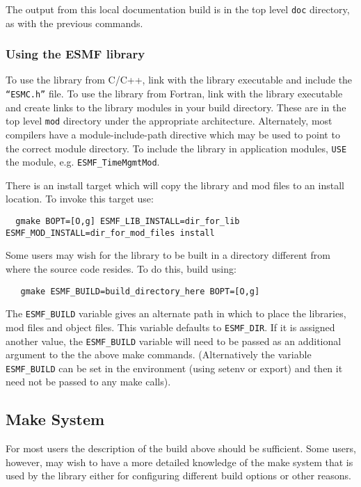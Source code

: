 \noindent The output from this local documentation build is in the top level {\tt doc}
directory, as with the previous commands.

\subsubsection{Using the ESMF library}
\label{UsingLibrary}
To use the library from C/C++, link with the library executable and include
the {\tt ``ESMC.h''} file.
To use the library from Fortran, link with the library executable and
create links to the library modules in your build directory.  These are
in the top level {\tt mod} directory under the appropriate architecture.  Alternately, 
most compilers have a module-include-path directive which may be used to point
to the correct module directory.
To include the library in application modules, {\tt USE} the
module, e.g. {\tt ESMF\_TimeMgmtMod}.  

There is an install target which will copy the library and mod files to an
install location.  To invoke this target use:
\begin{verbatim}
  gmake BOPT=[O,g] ESMF_LIB_INSTALL=dir_for_lib ESMF_MOD_INSTALL=dir_for_mod_files install 
\end{verbatim}

Some users may wish for the library to be built in a directory different from 
where the source code resides.  To do this, build using:
\begin{verbatim}
   gmake ESMF_BUILD=build_directory_here BOPT=[O,g]
\end{verbatim}

The {\tt ESMF\_BUILD} variable gives an alternate path in which to place the libraries,
mod files and object files.  This variable defaults to {\tt ESMF\_DIR}.  If it is 
assigned another value, the {\tt ESMF\_BUILD} variable will need to be passed as
an additional argument to the the above make commands.  (Alternatively the variable
{\tt ESMF\_BUILD} can be set in the environment (using setenv or export) and then it 
need not be passed to any make calls).

%
%
\subsection{Make System}
For most users the description of the build above should be sufficient.  Some
users, however, may wish to have a more detailed knowledge of the make system
that is used by the library either for configuring different build options or
other reasons.
